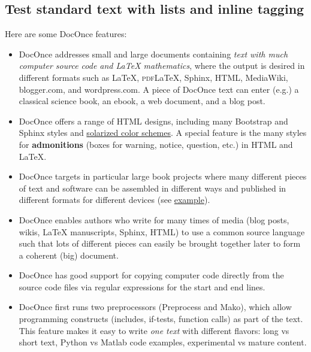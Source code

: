 \documentclass[%
oneside,                 %
final,                   %
10pt]{article}
\newcounter{doconce:movie:counter}
\begin{document}
\subsection{Test standard text with lists and inline tagging}

Here are some DocOnce features:

\begin{itemize}
  \item DocOnce addresses small and large documents containing
    \emph{text with much computer source code and
    {\LaTeX} mathematics}, where the output is desired in different formats
    such as {\LaTeX}, \textsc{pdf}{\LaTeX}, Sphinx, HTML,
    MediaWiki, blogger.com, and wordpress.com.
    A piece of DocOnce text can enter (e.g.) a classical
    science book, an ebook, a web document, and a blog post.

  \item DocOnce offers a range of HTML designs, including many
    Bootstrap and Sphinx styles and \href{{http://ethanschoonover.com/solarized}}{solarized color schemes}.
    A special feature is the many styles for \textbf{admonitions} (boxes for
    warning, notice, question, etc.) in HTML and {\LaTeX}.

  \item DocOnce targets in particular large book projects where many different
    pieces of text and software can be assembled in different ways
    and published in different formats for different devices
    (see \href{{http://hplgit.github.io/setup4book-doconce/doc/web/index.html}}{example}).

  \item DocOnce enables authors who write for many times of media
    (blog posts, wikis, {\LaTeX} manuscripts, Sphinx, HTML) to use a common
    source language such that lots of different pieces can easily be
    brought together later to form a coherent (big) document.

  \item DocOnce has good support for copying computer code
    directly from the source code files via regular expressions
    for the start and end lines.

  \item DocOnce first runs two preprocessors (Preprocess and Mako), which
    allow programming constructs (includes, if-tests, function calls)
    as part of the text. This feature makes it easy to write \emph{one text}
    with different flavors: long vs short text, Python vs Matlab code
    examples, experimental vs mature content.


\end{itemize}
\end{document}
